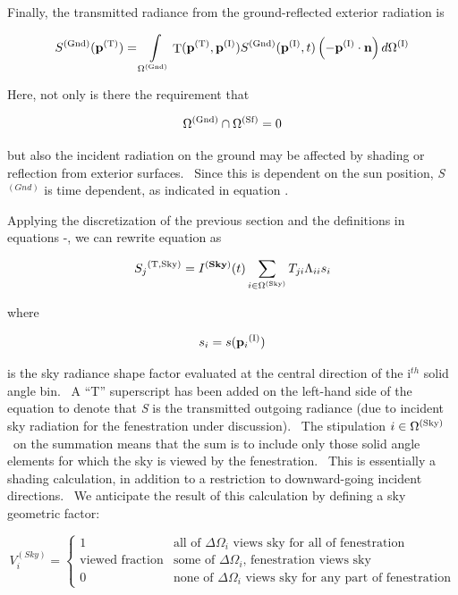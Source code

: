 Finally, the transmitted radiance from the ground-reflected exterior radiation is

\begin{equation}
{S^{{\rm{(Gnd)}}}}({{\bf{p}}^{{\rm{(T)}}}}) = \int\limits_{{\Omega ^{{\rm{(Gnd)}}}}} {{\mathop{\rm T}\nolimits} ({{\bf{p}}^{{\rm{(T)}}}},{{\bf{p}}^{{\rm{(I)}}}}){S^{{\rm{(Gnd)}}}}({{\bf{p}}^{{\rm{(I)}}}},t)\left( { - {{\bf{p}}^{{\rm{(I)}}}}\cdot {\bf{n}}} \right)d{\Omega ^{{\rm{(I)}}}}}
\end{equation}

Here, not only is there the requirement that

\begin{equation}
{\Omega ^{{\rm{(Gnd)}}}} \cap {\Omega ^{{\rm{(Sf)}}}} = 0
\end{equation}

but also the incident radiation on the ground may be affected by shading or reflection from exterior surfaces.~ Since this is dependent on the sun position, \emph{S}\(^{(Gnd)}\) is time dependent, as indicated in equation .

Applying the discretization of the previous section and the definitions in equations -, we can rewrite equation as

\begin{equation}
{S_j}^{{\rm{(T,Sky)}}} = {I^{({\bf{Sky}})}}(t)\sum\limits_{i \in {\Omega ^{{\rm{(Sky)}}}}} {{T_{ji}}{\Lambda_{ii}}{s_i}}
\end{equation}

where

\begin{equation}
{s_i} = s({{\bf{p}}_i}^{{\rm{(I)}}})
\end{equation}

is the sky radiance shape factor evaluated at the central direction of the i\(^{th}\) solid angle bin.~ A ``T'' superscript has been added on the left-hand side of the equation to denote that \emph{S} is the transmitted outgoing radiance (due to incident sky radiation for the fenestration under discussion).~ The stipulation \(i \in {\Omega ^{{\rm{(Sky)}}}}\) ~on the summation means that the sum is to include only those solid angle elements for which the sky is viewed by the fenestration.~ This is essentially a shading calculation, in addition to a restriction to downward-going incident directions.~ We anticipate the result of this calculation by defining a sky geometric factor:

\begin{equation}
V_i^{(Sky)} = \left\{
    \begin{array}{rl}
      1                      & \text{all of } \Delta\Omega_i \text{ views sky for all of fenestration} \\
      \text{viewed fraction} & \text{some of } \Delta\Omega_i \text{, fenestration views sky} \\
      0                      & \text{none of } \Delta\Omega_i \text{ views sky for any part of fenestration}
    \end{array}
  \right.
\end{equation}

